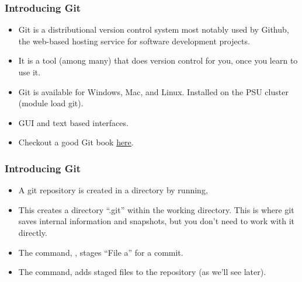 
\begin{frame}[c]\frametitle{Introducing Git}
    \begin{itemize}
    \item     Git is a distributional version control system most notably used
    by Github, the web-based hosting service for software development projects.
    
    \item It is a tool (among many) that does version control for you, once you learn to use it. 
    
    \item Git is available for Windows, Mac, and Linux. Installed on the PSU cluster (module load git). 
    
    \item GUI and text based interfaces. 
    
    \item Checkout a good Git book \href{http://git-scm.com/book}{here}.
    \end{itemize}
\end{frame}

\begin{frame}[c]\frametitle{Introducing Git}
\begin{itemize}
    \item A git repository is created in a directory by running, 
    \item This creates a directory ``.git'' within the working directory.
    This is where git saves internal information and snapshots, but you don't need to work with it directly.  
    \item The command,  , stages ``File a'' for a commit. 
    \item The command,  adds staged files to the repository (as we'll see later). 
\end{itemize}
   \end{frame}


